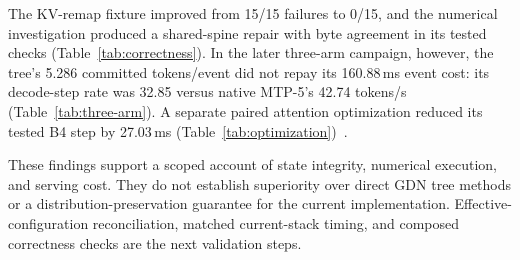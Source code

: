 \documentclass[conference]{IEEEtran}
\begin{document}
The KV-remap fixture improved from 15/15 failures to 0/15, and the numerical investigation produced a shared-spine repair with byte agreement in its tested checks (Table~\ref{tab:correctness}). In the later three-arm campaign, however, the tree's 5.286 committed tokens/event did not repay its 160.88\,ms event cost: its decode-step rate was 32.85 versus native MTP-5's 42.74 tokens/s (Table~\ref{tab:three-arm}). A separate paired attention optimization reduced its tested B4 step by 27.03\,ms (Table~\ref{tab:optimization})~\cite{lumo2026archive}.

These findings support a scoped account of state integrity, numerical execution, and serving cost. They do not establish superiority over direct GDN tree methods or a distribution-preservation guarantee for the current implementation. Effective-configuration reconciliation, matched current-stack timing, and composed correctness checks are the next validation steps.

\label{ReferencesStart}


\end{document}
